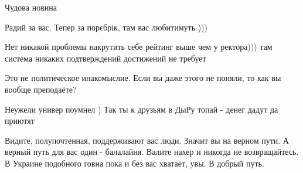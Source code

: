\begin{itemize}
 
Чудова новина

 
Радий за вас. Тепер за порєбрік, там вас любитимуть )))

 
Нет никакой проблемы накрутить себе рейтинг выше чем у ректора))) там система никаких подтверждений достижений не требует

 
Это не политическое инакомыслие. Если вы даже этого не поняли, то как вы вообще преподаёте?

 
Неужели универ поумнел )
Так ты к друзьям в ДыРу топай - денег дадут да приютят

 
Видите, полупочтенная, поддерживают вас люди. Значит вы на верном пути. А верный путь для вас один - балалайня. Валите нахер и никогда не возвращайтесь. В Украине подобного говна пока и без вас хватает, увы. В добрый путь.

 

\end{itemize}
